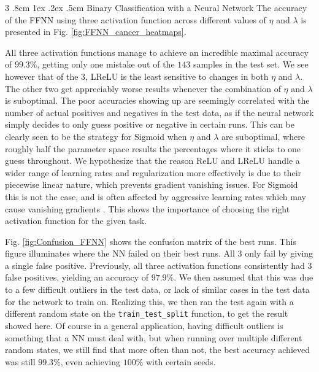 \documentclass[%
reprint,s
amsmath,amssymb,
aps,
]{revtex4-2}
\makeatletter
\renewcommand{\subsubsection}{%
	\@startsection
	{subsubsection}%
	{3}%
	{\z@}%
	{.8cm \@plus1ex \@minus .2ex}%
	{.5cm}%
	{\normalfont\small\centering}%
}
\makeatother
\begin{document}
\subsubsection{Binary Classification with a Neural Network}  
The accuracy of the FFNN using three activation function across different values of $\eta$ and $\lambda$ is presented in Fig. \ref{fig:FFNN_cancer_heatmaps}. 

All three activation functions manage to achieve an incredible maximal accuracy of $99.3\%$, getting only one mistake out of the $143$ samples in the test set. We see however that of the 3, LReLU is the least sensitive to changes in both $\eta$ and $\lambda$. The other two get appreciably worse results whenever the combination of $\eta$ and $\lambda$ is suboptimal. The poor accuracies showing up are seemingly correlated with the number of actual positives and negatives in the test data, as if the neural network simply decides to only guess positive or negative in certain runs. This can be clearly seen to be the strategy for Sigmoid when $\eta$ and $\lambda$ are suboptimal, where roughly half the parameter space results the percentages where it sticks to one guess throughout. We hypothesize that the reason ReLU and LReLU handle a wider range of learning rates and regularization more effectively is due to their piecewise linear nature, which prevents gradient vanishing issues. For Sigmoid this is not the case, and is often affected by aggressive learning rates which may cause vanishing gradients \cite{dubey2022activationfunctionsdeeplearning}. This shows the importance of choosing the right activation function for the given task. 

Fig. \ref{fig:Confusion_FFNN} shows the confusion matrix of the best runs. This figure illuminates where the NN failed on their best runs. All 3 only fail by giving a single false positive. Previously, all three activation functions consistently had 3 false positives, yielding an accuracy of $97.9\%$. We then assumed that this was due to a few difficult outliers in the test data, or lack of similar cases in the test data for the network to train on. Realizing this, we then ran the test again with a different random state on the \texttt{train\_test\_split} function, to get the result showed here. Of course in a general application, having difficult outliers is something that a NN must deal with, but when running over multiple different random states, we still find that more often than not, the best accuracy achieved was still $99.3\%$, even achieving $100\%$ with certain seeds.
\end{document}
